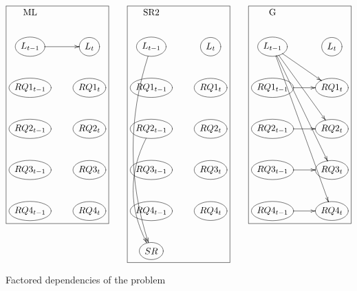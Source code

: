 \begin{figure}
\begin{displaymath}
\entrymodifiers={++[o][F-]}
\fbox{\xymatrix{
*\txt{ML} \\
L_{t-1} \ar[r] & L_t \\
RQ1_{t-1} & RQ1_t \\
RQ2_{t-1} & RQ2_t \\
RQ3_{t-1} & RQ3_t \\
RQ4_{t-1} & RQ4_t
}}
\qquad
\fbox{\xymatrix{
*\txt{SR2} \\
L_{t-1} \ar@/_20pt/[ddddd] & L_t \\
RQ1_{t-1} & RQ1_t \\
RQ2_{t-1} \ar@/_20pt/[ddd]& RQ2_t \\
RQ3_{t-1} & RQ3_t \\
RQ4_{t-1} & RQ4_t
\\
SR
}}
\qquad
\fbox{\xymatrix{
*\txt{G} \\
L_{t-1} \ar[dr] \ar [ddr] \ar[dddr] \ar[ddddr] & L_t \\
RQ1_{t-1} \ar[r] & RQ1_t \\
RQ2_{t-1} \ar[r] & RQ2_t \\
RQ3_{t-1} \ar[r] & RQ3_t \\
RQ4_{t-1} \ar[r] & RQ4_t
}}
\end{displaymath}
\caption{Factored dependencies of the problem}\label{figure:rocksample}
\end{figure}
